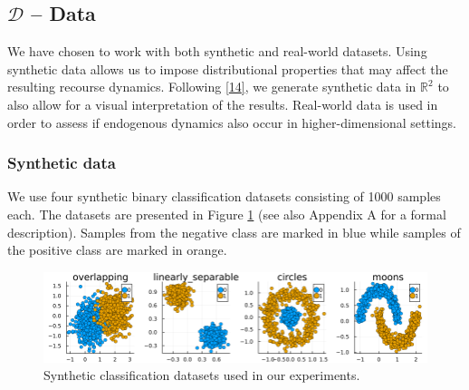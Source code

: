\documentclass[conference,final,]{IEEEtran}
\theoremstyle{definition}
\theoremstyle{definition}
\theoremstyle{definition}
\theoremstyle{definition}
\theoremstyle{remark}
\begin{document}
\hypertarget{empirical-data}{%
\subsection{\texorpdfstring{\(\mathcal{D}\) -- Data}{\textbackslash mathcal\{D\} -- Data}}\label{empirical-data}}

We have chosen to work with both synthetic and real-world datasets. Using synthetic data allows us to impose distributional properties that may affect the resulting recourse dynamics. Following \protect\hyperlink{ref-upadhyay2021towards}{{[}14{]}}, we generate synthetic data in \(\mathbb{R}^2\) to also allow for a visual interpretation of the results. Real-world data is used in order to assess if endogenous dynamics also occur in higher-dimensional settings.

\hypertarget{synthetic-data}{%
\subsubsection{Synthetic data}\label{synthetic-data}}

We use four synthetic binary classification datasets consisting of 1000 samples each. The datasets are presented in Figure \ref{fig:synthetic-data} (see also Appendix A for a formal description). Samples from the negative class are marked in blue while samples of the positive class are marked in orange.

\begin{figure}

{\centering \includegraphics[width=0.9\linewidth]{www/synthetic_data} 

}

\caption{Synthetic classification datasets used in our experiments.}\label{fig:synthetic-data}
\end{figure}
\end{document}
